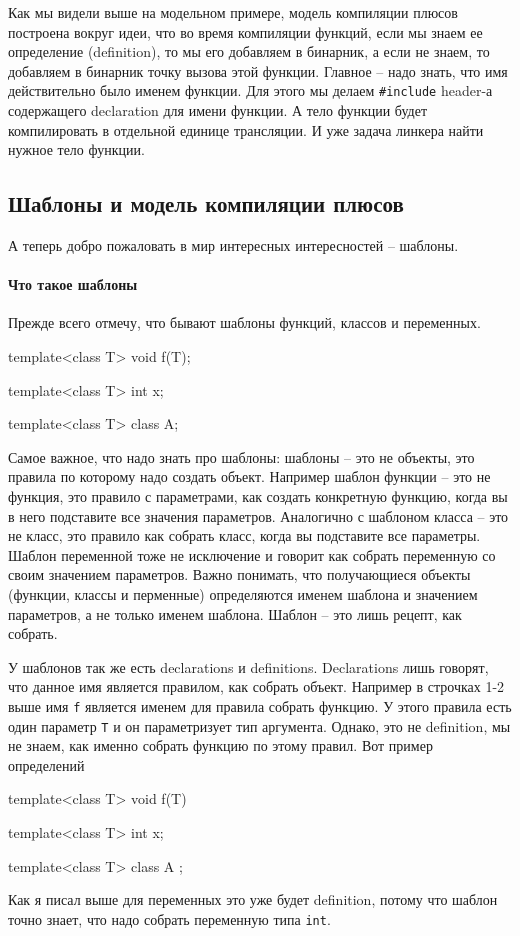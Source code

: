 \documentclass{article}
\begin{document}
Как мы видели выше на модельном примере, модель компиляции плюсов построена вокруг идеи, что во время компиляции функций, если мы знаем ее определение (definition), то мы его добавляем в бинарник, а если не знаем, то добавляем в бинарник точку вызова этой функции. Главное -- надо знать, что имя действительно было именем функции. Для этого мы делаем \verb"#include" header-а содержащего declaration для имени функции. А тело функции будет компилировать в отдельной единице трансляции. И уже задача линкера найти нужное тело функции.

\subsection{Шаблоны и модель компиляции плюсов}

А теперь добро пожаловать в мир интересных интересностей -- шаблоны. 

\paragraph{Что такое шаблоны}
Прежде всего отмечу, что бывают шаблоны функций, классов и переменных.
\begin{cppcode}
template<class T>
void f(T);

template<class T>
int x;

template<class T>
class A;
\end{cppcode}
Самое важное, что надо знать про шаблоны: шаблоны -- это не объекты, это правила по которому надо создать объект. Например шаблон функции -- это не функция, это правило с параметрами, как создать конкретную функцию, когда вы в него подставите все значения параметров. Аналогично с шаблоном класса -- это не класс, это правило как собрать класс, когда вы подставите все параметры. Шаблон переменной тоже не исключение и говорит как собрать переменную со своим значением параметров. Важно понимать, что получающиеся объекты (функции, классы и перменные) определяются именем шаблона и значением параметров, а не только именем шаблона. Шаблон -- это лишь рецепт, как собрать.

У шаблонов так же есть declarations и definitions. Declarations лишь говорят, что данное имя является правилом, как собрать объект. Например в строчках 1-2 выше имя \verb"f" является именем для правила собрать функцию. У этого правила есть один параметр \verb"T" и он параметризует тип аргумента. Однако, это не definition, мы не знаем, как именно собрать функцию по этому правил. Вот пример определений
\begin{cppcode}
template<class T>
void f(T) {}

template<class T>
int x;

template<class T>
class A {};
\end{cppcode}
Как я писал выше для переменных это уже будет definition, потому что шаблон точно знает, что надо собрать переменную типа \verb"int".
\end{document}
